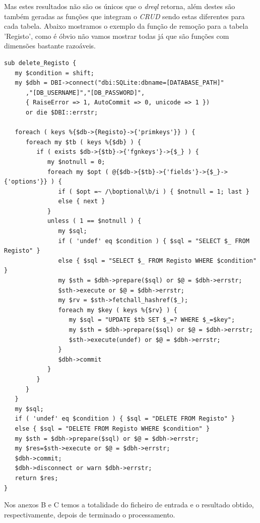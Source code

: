 \documentclass[a4paper]{article}
\begin{document}
\hspace{1cm}Mas estes resultados não são os únicos que o {\em dreql} retorna, além destes são também geradas as funções que integram o {\em CRUD} sendo estas diferentes para cada tabela. Abaixo mostramos o exemplo da função de remoção para a tabela 'Registo', como é óbvio não vamos mostrar todas já que são funções com dimensões bastante razoáveis.\\

\begin{small}
\begin{lstlisting}
sub delete_Registo {
   my $condition = shift;
   my $dbh = DBI->connect("dbi:SQLite:dbname=[DATABASE_PATH]"
      ,"[DB_USERNAME]","[DB_PASSWORD]",
      { RaiseError => 1, AutoCommit => 0, unicode => 1 })
      or die $DBI::errstr;

   foreach ( keys %{$db->{Registo}->{'primkeys'}} ) {
      foreach my $tb ( keys %{$db} ) {
         if ( exists $db->{$tb}->{'fgnkeys'}->{$_} ) {
            my $notnull = 0;
            foreach my $opt ( @{$db->{$tb}->{'fields'}->{$_}->{'options'}} ) {
               if ( $opt =~ /\boptional\b/i ) { $notnull = 1; last }
               else { next }
            }
            unless ( 1 == $notnull ) {
               my $sql;
               if ( 'undef' eq $condition ) { $sql = "SELECT $_ FROM Registo" }
               else { $sql = "SELECT $_ FROM Registo WHERE $condition" }
               my $sth = $dbh->prepare($sql) or $@ = $dbh->errstr;
               $sth->execute or $@ = $dbh->errstr;
               my $rv = $sth->fetchall_hashref($_);
               foreach my $key ( keys %{$rv} ) {
                  my $sql = "UPDATE $tb SET $_=? WHERE $_=$key";
                  my $sth = $dbh->prepare($sql) or $@ = $dbh->errstr;
                  $sth->execute(undef) or $@ = $dbh->errstr;
               }
               $dbh->commit
            }
         }
      }
   }
   my $sql;
   if ( 'undef' eq $condition ) { $sql = "DELETE FROM Registo" }
   else { $sql = "DELETE FROM Registo WHERE $condition" }
   my $sth = $dbh->prepare($sql) or $@ = $dbh->errstr;
   my $res=$sth->execute or $@ = $dbh->errstr;
   $dbh->commit;
   $dbh->disconnect or warn $dbh->errstr;
   return $res;
}
\end{lstlisting}
\end{small}

\bigskip
\hspace{1cm}Nos anexos B e C temos a totalidade do ficheiro de entrada e o resultado obtido, respectivamente, depois de terminado o processamento.
\end{document}
